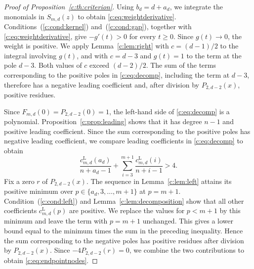 \documentclass[10pt,a4paper]{article}
\numberwithin{equation}{section}
\theoremstyle{remark}\newtheorem{remark}[theorem]{Remark}
\begin{document}
\begin{proof}[Proof of Proposition~\ref{c:th:criterion}]
Using $b_d=d+a_d$, we integrate the monomials in $S_{m,d}(z)$ to obtain
\eqref{c:eq:weightderivative}.
Conditions~(\ref{c:cond:kernel}) and~(\ref{c:cond:gap}), together with
\eqref{c:eq:weightderivative}, give $-g'(t)>0$ for every $t\ge0$.
Since $g(t)\to0$, the weight is positive.
We apply Lemma~\ref{c:lem:right} with
$c=(d-1)/2$ to the integral involving $g(t)$, and with $c=d-3$ and $g(t)=1$ to
the term at the pole $d-3$. Both values of $c$ exceed $(d-2)/2$.
The sum of the terms corresponding to the positive poles in \eqref{c:eq:decomp},
including the term at $d-3$, therefore has a negative leading
coefficient and, after division by $P_{2,d-2}(x)$, positive residues.

Since $F_{m,d}(0)=P_{2,d-2}(0)=1$, the left-hand side of
\eqref{c:eq:decomp} is a polynomial. Proposition~\ref{c:prop:leading}
shows that it has degree $n-1$ and positive leading coefficient.
Since the sum corresponding to the positive poles has negative leading coefficient,
we compare leading coefficients in \eqref{c:eq:decomp} to obtain
\[
 \frac{c_{m,d}^{\mathrm L}(a_d)}{n+a_d-1}
 +\sum_{i=3}^{m+1}\frac{c_{m,d}^{\mathrm L}(i)}{n+i-1}>4.
\]
Fix a zero $r$ of $P_{2,d-2}(x)$. The sequence in Lemma~\ref{c:lem:left}
attains its positive minimum over $p\in\{a_d,3,\ldots,m+1\}$ at $p=m+1$.
Condition~(\ref{c:cond:left}) and Lemma~\ref{c:lem:decomposition} show that
all other coefficients $c_{m,d}^{\mathrm L}(p)$ are positive.
We replace the values for $p<m+1$ by this minimum and leave the term
with $p=m+1$ unchanged. This gives a lower bound equal to the minimum
times the sum in the preceding inequality. Hence the sum corresponding
to the negative poles has positive residues after division by $P_{2,d-2}(x)$.
Since $-4P_{2,d-2}(r)=0$, we combine the two contributions to obtain
\eqref{c:eq:endpointnodes}.
\end{proof}
\end{document}

